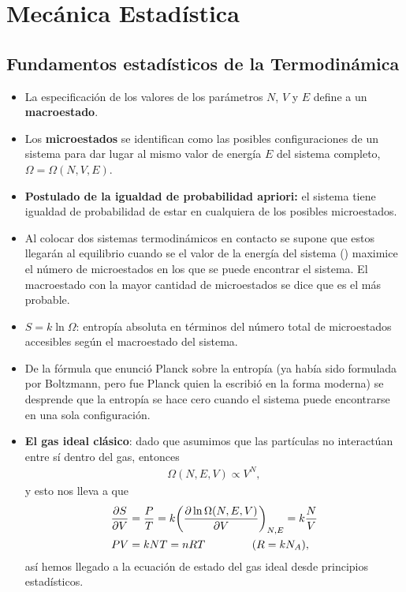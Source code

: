 \chapter{Mecánica Estadística}


\section{Fundamentos estadísticos de la Termodinámica}
\begin{itemize}
	\item La especificación de los valores de los parámetros $N$, $V$ y $E$
	define a un \textbf{macroestado}.
	
	\item Los \textbf{microestados} se identifican como las posibles 
	configuraciones de un sistema para dar lugar al mismo valor 
	de energía $E$ del sistema completo, $\Omega=\Omega(N,V,E).$
	
	\item \textbf{Postulado de la igualdad de probabilidad apriori:} el sistema
	tiene igualdad de probabilidad de estar en cualquiera de los posibles
	microestados.
	
	\item Al colocar dos sistemas termodinámicos en contacto se supone
	que estos llegarán al equilibrio cuando se el valor de la energía
	del sistema () maximice el número 
	de microestados en los que se puede encontrar el sistema.
	El macroestado con la mayor cantidad de microestados 
	se dice que es el más probable.
	
	\item $S=k\ln \Omega$: entropía absoluta en términos del número
	total de microestados accesibles según el macroestado del sistema.
	
	\item De la fórmula que enunció Planck sobre la entropía (ya había
	sido formulada por Boltzmann, pero fue Planck quien la escribió en la
	forma moderna) se desprende que la entropía se hace cero cuando 
	el sistema puede encontrarse en una sola configuración.
	
	\item \textbf{El gas ideal clásico}: dado que asumimos que las 
	partículas no interactúan entre sí dentro del gas, entonces
	\begin{align}
	\Omega (N,E,V)\propto V^N,
	\end{align}
	y esto nos lleva a que 
	\begin{align}
	\pdv{S}{V}&=\frac{P}{T}=k\qty(\pdv{\ln \Omega \qty(N,E,V)}{V})_{N,E}=
	k\frac{N}{V}  \\
	PV&=kNT = nRT \hspace{1.5cm} (R=kN_A),
	\end{align}
	así hemos llegado a la ecuación de estado del gas ideal desde 
	principios estadísticos.
	

\end{itemize}
